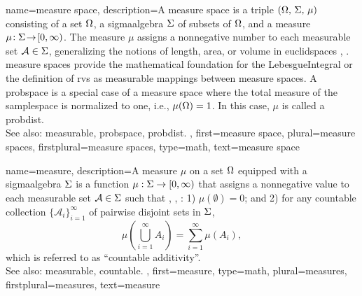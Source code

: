 {name={measure space},
	description={A \gls{measure} space is a triple $(\Omega, \,\Sigma, \,\mu)$ consisting of 
        		a set $\Omega$, a \gls{sigmaalgebra} $\Sigma$ of subsets 
		of $\Omega$, and a \gls{measure} $\mu\!:\Sigma\!\to\![0,\infty)$. 
        		The \gls{measure} $\mu$ assigns a nonnegative number to each \gls{measurable} 
		set $\mathcal{A} \in \Sigma$, generalizing the 
		notions of length, area, or volume in \glspl{euclidspace} \cite{RudinBookPrinciplesMatheAnalysis}, \cite{HalmosMeasure}. 
		\Gls{measure} spaces provide the mathematical foundation for the 
		\gls{LebesgueIntegral} or the definition of \glspl{rv} as \gls{measurable} mappings 
        		between \gls{measure} spaces.  
        		A \gls{probspace} is a special case of a \gls{measure} space 
		where the total \gls{measure} of the \gls{samplespace} is normalized to one, 
        		i.e., $\mu(\Omega) = 1$. In this case, $\mu$ is called a \gls{probdist}.
		\\ 
		See also: \gls{measurable}, \gls{probspace}, \gls{probdist}. },
    	first={measure space},
	plural={measure spaces}, 
	firstplural={measure spaces}, 
	type=math, 
    	text={measure space}
}

{name={measure},
	description={A measure $\mu$ on a set $\Omega$ equipped with a 
		\gls{sigmaalgebra} $\Sigma$ is a \gls{function} $\mu: \Sigma \to [0, \infty)$ 
		that assigns a nonnegative value to each \gls{measurable} set 
		$\mathcal{A} \in \Sigma$ such that 
		\cite{RudinBookPrinciplesMatheAnalysis}, \cite{BillingsleyProbMeasure}, \cite{HalmosMeasure}: 
		1) $\mu(\emptyset) = 0$; and 
		2) for any \gls{countable} collection $\{\mathcal{A}_i\}_{i=1}^{\infty}$ of 
		pairwise disjoint sets in $\Sigma$,
		\[
		\mu\!\left(\bigcup_{i=1}^{\infty} A_i\right) = \sum_{i=1}^{\infty} \mu(A_i),
		\]
		which is referred to as ``\gls{countable} additivity''.
		\\
		See also: \gls{measurable}, \gls{countable}. },
	first={measure},
	type=math, 
	plural={measures}, 
	firstplural={measures}, 
	text={measure}
}

